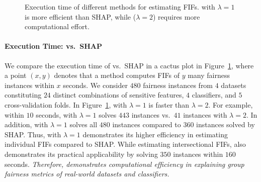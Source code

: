 \begin{figure}
	\centering
	\caption[Execution time of FIFs in $ \mathsf{SP} $]{Execution time of different methods for estimating FIFs. {\fairXplainer} with $ \lambda = 1 $ is more efficient than SHAP, while {\fairXplainer} ($ \lambda = 2 $) requires more computational effort.
	}
	\label{fairness_fairXplainer_fig:execution_time_cactus_plot}
\end{figure}



\paragraph{Execution Time: {\fairXplainer} vs.\ SHAP} We compare the execution time of {\fairXplainer} vs.\ SHAP in a cactus plot in Figure~\ref{fairness_fairXplainer_fig:execution_time_cactus_plot}, where a point $ (x, y) $ denotes that a method computes FIFs of $ y $ many fairness instances within $ x $ seconds. We consider $ 480 $ fairness instances from $ 4 $ datasets constituting $ 24 $ distinct combinations of sensitive features, $ 4 $ classifiers, and $ 5 $ cross-validation folds. In Figure~\ref{fairness_fairXplainer_fig:execution_time_cactus_plot},  {\fairXplainer} with $ \lambda = 1 $ is faster than  $ \lambda = 2 $. For example, within $ 10 $ seconds, {\fairXplainer} with $ \lambda = 1 $ solves $ 443 $ instances vs.\ $ 41 $ instances with $ \lambda = 2 $.  In addition, {\fairXplainer} with $ \lambda = 1 $ solves all $ 480 $ instances compared to $ 360 $ instances solved by SHAP. Thus, {\fairXplainer} with $ \lambda = 1 $ demonstrates its higher efficiency in estimating individual FIFs compared to SHAP. While estimating intersectional FIFs, {\fairXplainer} also demonstrates its practical applicability by solving $ 350 $ instances within  $ 160 $ seconds. \textit{Therefore, {\fairXplainer} demonstrates computational efficiency in explaining group fairness metrics of real-world datasets and classifiers.}



